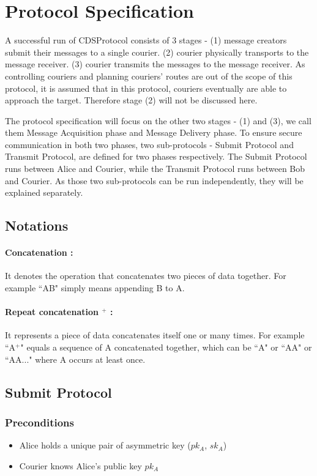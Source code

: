 \section*{Protocol Specification}
A successful run of CDSProtocol consists of 3 stages - (1) message creators submit their messages to a single courier. (2) courier physically transports to the message receiver. (3) courier transmits the messages to the message receiver. As controlling couriers and  planning couriers' routes are out of the scope of this protocol, it is assumed that in this protocol, couriers eventually are able to approach the target. Therefore stage (2) will not be discussed here. \par
The protocol specification will focus on the other two stages - (1) and (3), we call them Message Acquisition phase and Message Delivery phase. To ensure secure communication in both two phases, two sub-protocols - Submit Protocol and Transmit Protocol, are defined for two phases respectively. The Submit Protocol runs between Alice and Courier, while the Transmit Protocol runs between Bob and Courier. As those two sub-protocols can be run independently, they will be explained separately.
\subsection{Notations}
\paragraph{Concatenation \textbar\textbar :}
It denotes the operation that concatenates two pieces of data together. For example ``A\textbar\textbar B" simply means appending B to A.
\paragraph{Repeat concatenation $^+$ :}
It represents a piece of data concatenates itself one or many times. For example ``A$^+$" equals a sequence of A concatenated together, which can be ``A" or ``A\textbar\textbar A" or ``A\textbar\textbar A\textbar\textbar  ..." where A occurs at least once.
\subsection{Submit Protocol}
\subsubsection{Preconditions}
\begin{itemize}
\item Alice holds a unique pair of asymmetric key ($pk_A$, $sk_A$)
\item Courier knows Alice's public key $pk_A$
\end{itemize}
